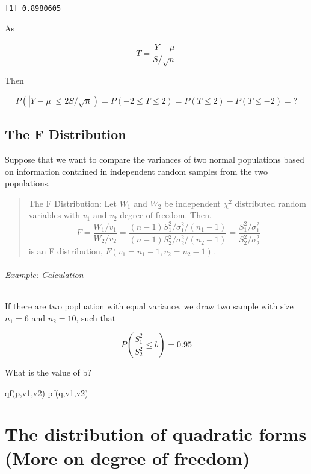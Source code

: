 \documentclass[
  letterpaper,
  DIV=11,
  numbers=noendperiod]{scrreprt}
\let\oldsubparagraph\subparagraph
\renewcommand{\subparagraph}[1]{\oldsubparagraph{#1}\mbox{}}
\newenvironment{Shaded}{\begin{snugshade}}{\end{snugshade}}
\newcommand{\FunctionTok}[1]{\textcolor[rgb]{0.28,0.35,0.67}{#1}}
\newcommand{\NormalTok}[1]{\textcolor[rgb]{0.00,0.23,0.31}{#1}}
\theoremstyle{plain}
\theoremstyle{remark}
\begin{document}
\begin{verbatim}
[1] 0.8980605
\end{verbatim}

As

\[
T=\frac{\bar{Y}-\mu}{S/\sqrt{n}}
\]

Then

\[
P(|\bar{Y}-\mu|\leq 2S/\sqrt{n})=P(-2\leq T \leq 2)= P(T\leq 2)-P(T\leq -2)=?
\]

\hypertarget{the-f-distribution}{%
\section{The F Distribution}\label{the-f-distribution}}

Suppose that we want to compare the variances of two normal populations
based on information contained in independent random samples from the
two populations.

\begin{quote}
The F Distribution: Let \(W_1\) and \(W_2\) be independent \(\chi^2\)
distributed random variables with \(v_1\) and \(v_2\) degree of freedom.
Then, \[
F=\frac{W_1/v_1}{W_2/v_2}=\frac{(n-1)S^2_1/\sigma^2_1/(n_1-1)}{(n-1)S^2_2/\sigma^2_2/(n_2-1)}=\frac{S^2_1/\sigma^2_1}{S^2_2/\sigma^2_2}
\] is an F distribution, \(F(v_1=n_1-1,v_2=n_2-1)\).
\end{quote}

\hypertarget{example-calculation-3}{%
\subparagraph{Example: Calculation}\label{example-calculation-3}}

If there are two popluation with equal variance, we draw two sample with
size \(n_1=6\) and \(n_2=10\), such that

\[
P(\frac{S^2_1}{S^2_2} \leq b)=0.95
\]

What is the value of b?

\begin{Shaded}
\begin{Highlighting}[]
\FunctionTok{qf}\NormalTok{(p,v1,v2)}
\FunctionTok{pf}\NormalTok{(q,v1,v2)}
\end{Highlighting}
\end{Shaded}


\hypertarget{the-distribution-of-quadratic-forms-more-on-degree-of-freedom}{%
\chapter{The distribution of quadratic forms (More on degree of
freedom)}\label{the-distribution-of-quadratic-forms-more-on-degree-of-freedom}}
\end{document}
